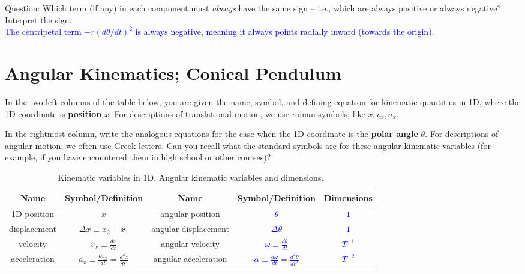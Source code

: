 \documentclass[11pt, letterpaper, openany]{book}
\newenvironment{exercise}[1][Exercise]{%
  \tcolorbox[blanker, breakable, left=1em,
    before skip=1em, after skip=1em,
    borderline west={3pt}{0pt}{PhysNavy},
    colback=PhysCream,
    before upper={\textcolor{PhysNavy}{\sffamily\bfseries #1:}\space}
  ]%
}{%
  \endtcolorbox%
}
\begin{document}
\begin{exercise}[Exercise 4]
\begin{enumerate}[label=(\alph*)]
    Question: Which term (if any) in each component must \textit{always} have the same sign -- i.e., which are always positive or always negative? Interpret the sign. \\
    \textcolor{blue}{The centripetal term $-r(d\theta/dt)^2$ is always negative, meaning it always points radially inward (towards the origin).}
\end{enumerate}
\end{exercise}

\chapter{Angular Kinematics; Conical Pendulum}

\begin{exercise}[Exercise 1]
In the two left columns of the table below, you are given the name, symbol, and defining equation for kinematic quantities in 1D, where the 1D coordinate is \textbf{position} $x$. For descriptions of translational motion, we use roman symbols, like $x, v_x, a_x$.

In the rightmost column, write the analogous equations for the case when the 1D coordinate is the \textbf{polar angle} $\theta$. For descriptions of angular motion, we often use Greek letters. Can you recall what the standard symbols are for these angular kinematic variables (for example, if you have encountered them in high school or other courses)?

\begin{table}[h!]
\centering
\caption{Kinematic variables in 1D. Angular kinematic variables and dimensions.}
\renewcommand{\arraystretch}{1.5}
\begin{tabular}{|c|c||c|c|c|}
\hline
Name & Symbol/Definition & Name & Symbol/Definition & Dimensions \\ \hline
1D position & $x$ & angular position & \textcolor{blue}{$\theta$} & \textcolor{blue}{$1$} \\ \hline
displacement & $\Delta x \equiv x_2 - x_1$ & angular displacement & \textcolor{blue}{$\Delta\theta$} & \textcolor{blue}{$1$} \\ \hline
velocity & $v_x \equiv \frac{dx}{dt}$ & angular velocity & \textcolor{blue}{$\omega \equiv \frac{d\theta}{dt}$} & \textcolor{blue}{$T^{-1}$} \\ \hline
acceleration & $a_x \equiv \frac{dv_x}{dt} = \frac{d^2x}{dt^2}$ & angular acceleration & \textcolor{blue}{$\alpha \equiv \frac{d\omega}{dt} = \frac{d^2\theta}{dt^2}$} & \textcolor{blue}{$T^{-2}$} \\ \hline
\end{tabular}
\end{table}
\end{exercise}
\end{document}
